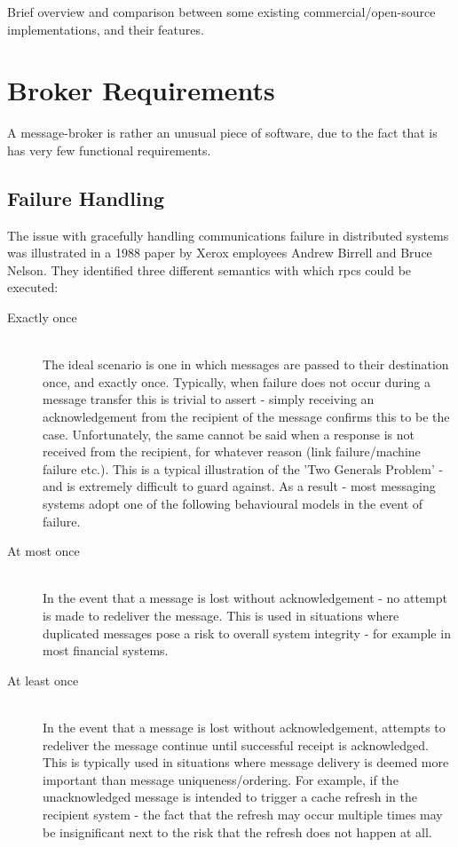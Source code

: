 Brief overview and comparison between some existing commercial/open-source
implementations, and their features.


\section{Broker Requirements}
\label{sec:requirements}

A message-broker is rather an unusual piece of software, due to the fact that is has very few functional requirements.

\subsection{Failure Handling}
\label{sub:Failure Handling}

The issue with gracefully handling communications failure in distributed systems
was illustrated in a 1988 paper by Xerox employees
Andrew Birrell and Bruce Nelson\cite{Birrell:1988:IRP:59309.59336}. They identified
three different semantics with which \glspl{rpc} could be executed:

\begin{description}
  \item[Exactly once] \hfill \\
    The ideal scenario is one in which messages are passed to their destination
    once, and exactly once. Typically, when failure does not occur during a
    message transfer this is trivial to assert - simply receiving an acknowledgement
    from the recipient of the message confirms this to be the case.
    Unfortunately, the same cannot be said when a response is not received from
    the recipient, for whatever reason (link failure/machine failure etc.).
    This is a typical illustration of the
    'Two Generals Problem'\cite{Gray:1978:NDB:647433.723863} - and is extremely
    difficult to guard against. As a result - most messaging systems adopt one
    of the following behavioural models in the event of failure.
  \item[At most once] \hfill \\
    In the event that a message is lost without acknowledgement - no attempt is made
    to redeliver the message. This is used in situations where duplicated messages
    pose a risk to overall system integrity - for example in most financial systems.
  \item[At least once] \hfill \\
    In the event that a message is lost without acknowledgement, attempts to
    redeliver the message continue until successful receipt is acknowledged.
    This is typically used in situations where message delivery is deemed more
    important than message uniqueness/ordering. For example, if the unacknowledged
    message is intended to trigger a cache refresh in the recipient system - the
    fact that the refresh may occur multiple times may be insignificant next to
    the risk that the refresh does not happen at all.
\end{description}

